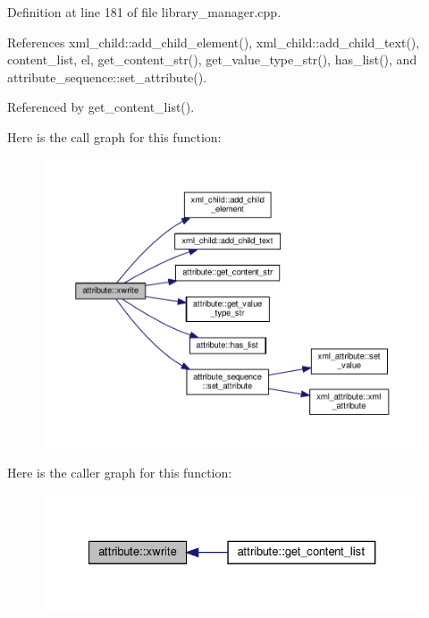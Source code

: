 Definition at line 181 of file library\+\_\+manager.\+cpp.



References xml\+\_\+child\+::add\+\_\+child\+\_\+element(), xml\+\_\+child\+::add\+\_\+child\+\_\+text(), content\+\_\+list, el, get\+\_\+content\+\_\+str(), get\+\_\+value\+\_\+type\+\_\+str(), has\+\_\+list(), and attribute\+\_\+sequence\+::set\+\_\+attribute().



Referenced by get\+\_\+content\+\_\+list().

Here is the call graph for this function\+:
\nopagebreak
\begin{figure}[H]
\begin{center}
\leavevmode
\includegraphics[width=350pt]{d9/d18/structattribute_a0e1018c57c6411e0994c8d2653ea3593_cgraph}
\end{center}
\end{figure}
Here is the caller graph for this function\+:
\nopagebreak
\begin{figure}[H]
\begin{center}
\leavevmode
\includegraphics[width=327pt]{d9/d18/structattribute_a0e1018c57c6411e0994c8d2653ea3593_icgraph}
\end{center}
\end{figure}


